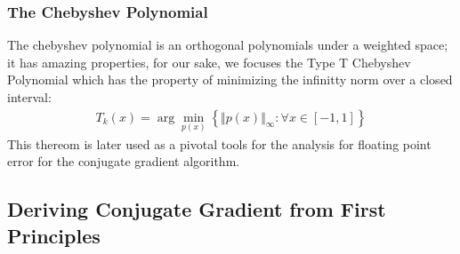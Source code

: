 \documentclass[]{article}
\theoremstyle{definition}
\begin{document}
        \subsubsection{The Chebyshev Polynomial}
            The chebyshev polynomial is an orthogonal polynomials under a weighted space; it has amazing properties, for our sake, we focuses the Type T Chebyshev Polynomial which has the property of minimizing the infinitty norm over a closed interval: 
            \begin{align}
                T_k(x) = \arg\min_{p(x)}
                \left\lbrace
                    \Vert p(x) \Vert_\infty: \forall x \in [-1, 1]
                \right\rbrace
            \end{align}
            This thereom is later used as a pivotal tools for the analysis for floating point error for the conjugate gradient algorithm. 

    \subsection{Deriving Conjugate Gradient from First Principles}
\end{document}

